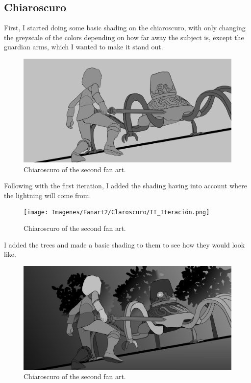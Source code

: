 \documentclass{cup-pan}
\begin{document}
\newpage
    \subsection{Chiaroscuro}

        First, I started doing some basic shading on the chiaroscuro, with only changing the greyscale of the colors depending on how far away the subject is, except the guardian arms, which I wanted to make it stand out. 
        \begin{figure}[H]
            \includegraphics[width=\textwidth]{Imagenes/Fanart2/Claroscuro/I_Iteracion.png}
            \caption{Chiaroscuro of the second fan art.}
        \end{figure}

        Following with the first iteration, I added the shading having into account where the lightning will come from.
        \begin{figure}[H]
            \texttt{[image: Imagenes/Fanart2/Claroscuro/II\_Iteración.png]}
            \caption{Chiaroscuro of the second fan art.}
        \end{figure}

        I added the trees and made a basic shading to them to see how they would look like. 
        \begin{figure}[H]
            \includegraphics[width=\textwidth]{Imagenes/Fanart2/Claroscuro/III_Iteraion.png}
            \caption{Chiaroscuro of the second fan art.}
        \end{figure}
\end{document}
